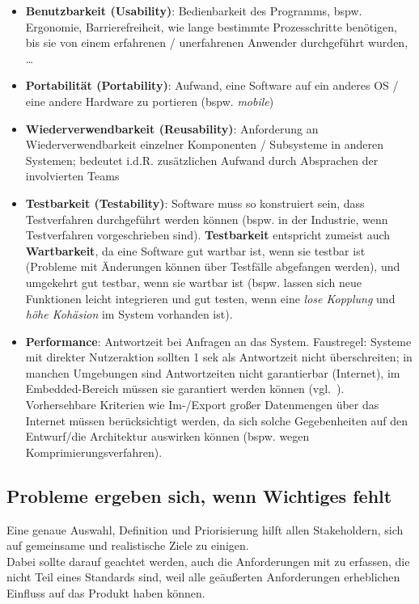 \begin{itemize}
    \item \textbf{Benutzbarkeit (Usability)}: Bedienbarkeit des Programms, bspw. Ergonomie, Barrierefreiheit, wie lange bestimmte Prozesschritte benötigen, bis sie von einem erfahrenen / unerfahrenen Anwender durchgeführt wurden, \ldots
    \item \textbf{Portabilität (Portability)}: Aufwand, eine Software auf ein anderes OS / eine andere Hardware zu portieren (bspw. \textit{mobile})
    \item \textbf{Wiederverwendbarkeit (Reusability)}: Anforderung an Wiederverwendbarkeit einzelner Komponenten / Subsysteme in anderen Systemen; bedeutet i.d.R. zusätzlichen Aufwand durch Absprachen der involvierten Teams
    \item \textbf{Testbarkeit (Testability)}: Software muss so konstruiert sein, dass Testverfahren durchgeführt werden können (bspw. in der Industrie, wenn Testverfahren vorgeschrieben sind). \textbf{Testbarkeit} entspricht zumeist auch \textbf{Wartbarkeit}, da eine Software gut wartbar ist, wenn sie testbar ist (Probleme mit Änderungen können über Testfälle abgefangen werden), und umgekehrt gut testbar, wenn sie wartbar ist (bspw. lassen sich neue Funktionen leicht integrieren und gut testen, wenn eine \textit{lose Kopplung} und \textit{höhe Kohäsion} im System vorhanden ist).
    \item \textbf{Performance}: Antwortzeit bei Anfragen an das System.
    Faustregel: Systeme mit direkter Nutzeraktion sollten 1 sek als Antwortzeit nicht überschreiten; in manchen Umgebungen sind Antwortzeiten nicht garantierbar (Internet), im Embedded-Bereich müssen sie garantiert werden können (vgl.~\cite[62]{Wed09}).
    Vorhersehbare Kriterien wie Im-/Export großer Datenmengen über das Internet müssen berücksichtigt werden, da sich solche Gegebenheiten auf den Entwurf/die Architektur auswirken können (bspw. wegen Komprimierungsverfahren).
\end{itemize}


\subsection*{Probleme ergeben sich, wenn Wichtiges fehlt}
Eine genaue Auswahl, Definition und Priorisierung hilft allen Stakeholdern, sich auf gemeinsame und realistische Ziele zu einigen.\\
Dabei sollte darauf geachtet werden, auch die Anforderungen mit zu erfassen, die nicht Teil eines Standards sind, weil alle geäußerten Anforderungen erheblichen Einfluss auf das Produkt haben können.


